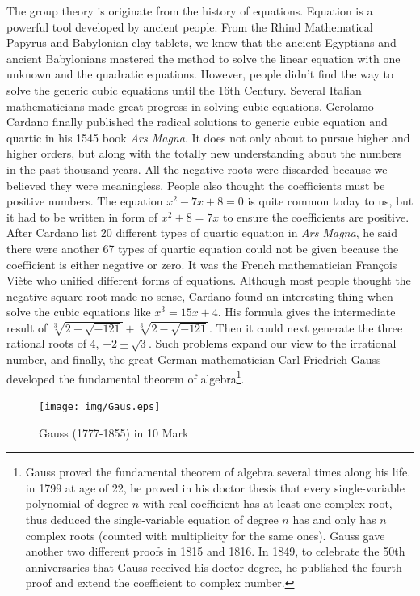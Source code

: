 \documentclass{article}
\begin{document}
The group theory is originate from the history of equations. Equation is a powerful tool developed by ancient people. From the Rhind Mathematical Papyrus and Babylonian clay tablets, we know that the ancient Egyptians and ancient Babylonians mastered the method to solve the linear equation with one unknown and the quadratic equations. However, people didn't find the way to solve the generic cubic equations until the 16th Century. Several Italian mathematicians made great progress in solving cubic equations. Gerolamo Cardano finally published the radical solutions to generic cubic equation and quartic in his 1545 book {\em Ars Magna}. It does not only about to pursue higher and higher orders, but along with the totally new understanding about the numbers in the past thousand years. All the negative roots were discarded because we believed they were meaningless. People also thought the coefficients must be positive numbers. The equation $x^2 - 7x + 8 = 0$ is quite common today to us, but it had to be written in form of $x^2 + 8 = 7x$ to ensure the coefficients are positive. After Cardano list 20 different types of quartic equation in {\em Ars Magna}, he said there were another 67 types of quartic equation could not be given because the coefficient is either negative or zero\cite{HanXueTao2012}. It was the French mathematician François Viète who unified different forms of equations. Although most people thought the negative square root made no sense, Cardano found an interesting thing when solve the cubic equations like $x^3 = 15x +4$. His formula gives the intermediate result of $\sqrt[3]{2 + \sqrt{-121}} + \sqrt[3]{2 - \sqrt{-121}}$. Then it could next generate the three rational roots of 4, $-2 \pm \sqrt{3}$. Such problems expand our view to the irrational number, and finally, the great German mathematician Carl Friedrich Gauss developed the fundamental theorem of algebra\footnote{Gauss proved the fundamental theorem of algebra several times along his life. in 1799 at age of 22, he proved in his doctor thesis that every single-variable polynomial of degree $n$ with real coefficient has at least one complex root, thus deduced the single-variable equation of degree $n$ has and only has $n$ complex roots (counted with multiplicity for the same ones). Gauss gave another two different proofs in 1815 and 1816. In 1849, to celebrate the 50th anniversaries that Gauss received his doctor degree, he published the fourth proof and extend the coefficient to complex number.}.

\begin{figure}[htbp]
 \centering
 \texttt{[image: img/Gaus.eps]}
 \captionsetup{labelformat=empty}
 \caption{Gauss (1777-1855) in 10 Mark}
 \label{fig:Gauss}
\end{figure}
\end{document}
